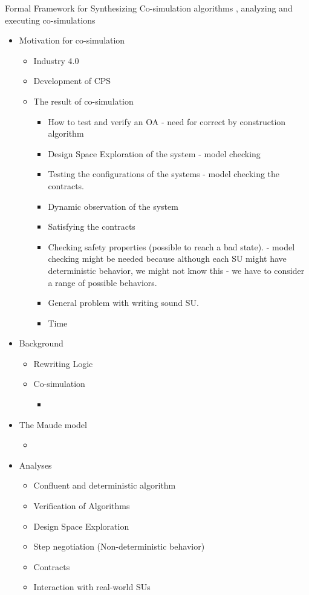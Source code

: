 \documentclass[runningheads]{llncs}
\begin{document}
Formal Framework for Synthesizing Co-simulation algorithms
, analyzing and executing co-simulations
\begin{itemize}
  \item Motivation for co-simulation
  \begin{itemize}
    \item Industry 4.0
    \item Development of CPS
    \item The result of co-simulation
    \begin{itemize}
    \item How to test and verify an OA - need for correct by construction algorithm
    \item Design Space Exploration of the system - model checking 
    \item Testing the configurations of the systems - model checking the contracts.
    \item Dynamic observation of the system
    \item Satisfying the contracts
    \item Checking safety properties (possible to reach a bad state). - model checking might be needed because although each SU might have deterministic behavior, we might not know this - we have to consider a range of possible behaviors.
    \item General problem with writing sound SU.
    \item Time 
  \end{itemize}
  \end{itemize}
  \item Background
  \begin{itemize}
    \item Rewriting Logic
    \item Co-simulation
    \begin{itemize}
      \item 
    \end{itemize}
  \end{itemize}
  \item The Maude model
  \begin{itemize}
    \item 
  \end{itemize}
  \item Analyses
  \begin{itemize}
    \item Confluent and deterministic algorithm
    \item Verification of Algorithms
    \item Design Space Exploration
    \item Step negotiation (Non-deterministic behavior)
    \item Contracts
    \item Interaction with real-world SUs
  \end{itemize}
\end{itemize}
\end{document}
